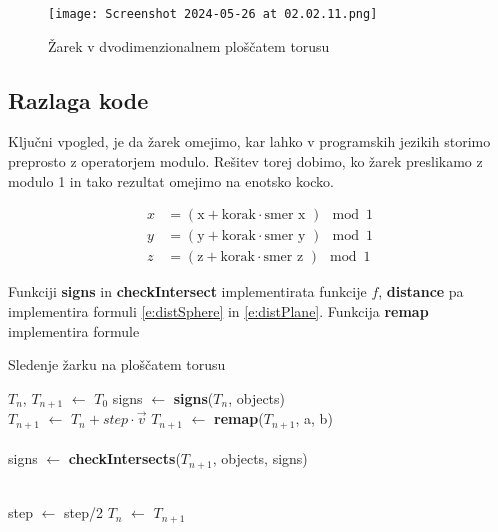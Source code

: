 \documentclass[titlepage]{article}
\begin{document}
\begin{figure}[H]
    \centering
    \texttt{[image: Screenshot 2024-05-26 at 02.02.11.png]}
    \caption{Žarek v dvodimenzionalnem ploščatem torusu}
    \label{Slika:Žarek v dvodimenzionalnem ploščatem torusu}
\end{figure}



\subsection{Razlaga kode}

Ključni vpogled, je da žarek omejimo, kar lahko v programskih jezikih storimo preprosto z operatorjem modulo. Rešitev torej dobimo, ko žarek preslikamo z modulo 1 in tako rezultat omejimo na enotsko kocko.
        
\begin{align*}
x &= \left( \text{x} + \text{korak} \cdot \text{smer x }\right) \mod 1 \\
y &= \left( \text{y} + \text{korak} \cdot \text{smer y }\right) \mod 1 \\
z &= \left( \text{z} + \text{korak} \cdot \text{smer z }\right) \mod 1
\end{align*}


Funkciji \textbf{signs} in \textbf{checkIntersect} implementirata funkcije $f$, \textbf{distance} pa implementira formuli \eqref{e:distSphere} in 
\eqref{e:distPlane}. Funkcija \textbf{remap} implementira formule %
\begin{algorithm}
    \caption{Sledenje žarku na ploščatem torusu}
\begin{algorithmic}

    \State $T_{n}$, $T_{n+1}$ $\gets$ $T_{0}$
    \State signs $\gets$ \textbf{signs}($T_{n}$, objects)
    \\
      \State {}
      \State {}
    \EndIf
    \State $T_{n+1}$ $\gets$ $T_{n}+step \cdot \vec{v}$
    \State $T_{n+1}$ $\gets$ \textbf{remap}($T_{n+1}$, a, b)
    \\
    \\
    \State signs $\gets$ \textbf{checkIntersects}($T_{n+1}$, objects, signs)
    \\
    \\

        \State step $\gets$ step/2
    \Else
      \State $T_{n}$ $\gets$ $T_{n+1}$
    \EndIf
  \EndWhile
\EndFunction
\end{algorithmic}
\end{algorithm}
\end{document}
